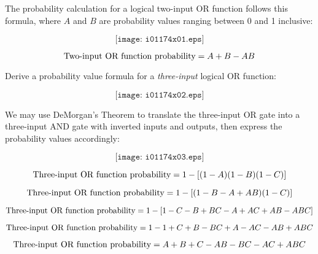 

The probability calculation for a logical two-input OR function follows this formula, where $A$ and $B$ are probability values ranging between 0 and 1 inclusive:

$$\texttt{[image: i01174x01.eps]}$$

$$\hbox{Two-input OR function probability} = A + B - AB$$

\vskip 10pt

Derive a probability value formula for a {\it three-input} logical OR function:

$$\texttt{[image: i01174x02.eps]}$$







We may use DeMorgan's Theorem to translate the three-input OR gate into a three-input AND gate with inverted inputs and outputs, then express the probability values accordingly:
 
$$\texttt{[image: i01174x03.eps]}$$

$$\hbox{Three-input OR function probability} = 1 - [(1 - A)(1 - B)(1 - C)]$$

$$\hbox{Three-input OR function probability} = 1 - [(1 - B - A + AB)(1 - C)]$$

$$\hbox{Three-input OR function probability} = 1 - [1 - C - B + BC - A + AC + AB - ABC]$$

$$\hbox{Three-input OR function probability} = 1 - 1 + C + B - BC + A - AC - AB + ABC$$

$$\hbox{Three-input OR function probability} = A + B + C - AB - BC - AC + ABC$$











